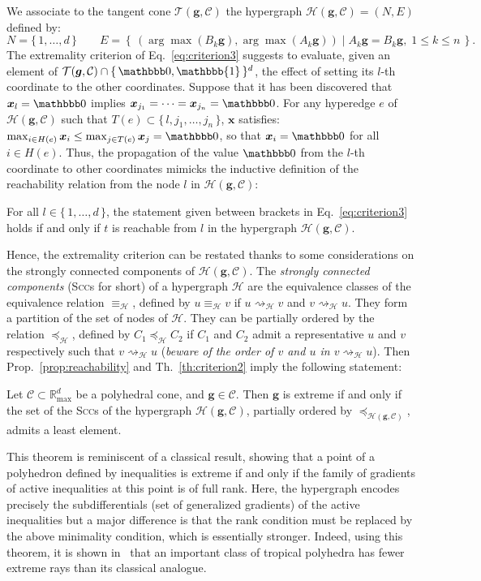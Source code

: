 \documentclass[proceedings]{stacs}
\newcommand{\maxplus}{\mathbb{R}_{\max}}
\newcommand{\mpone}{\mathbbb{1}}
\newcommand{\vect}[1]{\boldsymbol #1}
\newcommand{\CC}{\mathcal{C}}
\newcommand{\HH}{\mathcal{H}}
\newcommand{\argmax}{\arg\max}\newcommand{\tangent}{\mathcal{T}}
\newcommand{\mpzeroone}{\{\,\mpzero,\mpone\,\}}\newcommand{\mponealt}{\mpone}
\newcommand{\reachable}{\rightsquigarrow}
\newcommand{\reach}{\reachable}
\newcommand{\reacheq}{\equiv}
\newcommand{\reachleq}{\preceq}
\newcommand{\scc}{\textsc{Scc}}
\begin{document}
We associate to the tangent cone $\tangent(\vect{g}, \CC)$ the hypergraph $\HH(\vect{g},\CC) = (N,E)$ defined by:
\[
N = \{\, 1,\dots,d\, \} \qquad E = \left\{\, (\argmax(B_k \vect{g}), \argmax(A_k \vect{g})) \mid A_k \vect{g} = B_k \vect{g}, \; 1 \leq k \leq n \,\right\}.
\]
The extremality criterion of Eq.~\eqref{eq:criterion3} suggests to evaluate, given an element of $\tangent(\vect{g},\CC) \cap \mpzeroone^d$, the effect of setting its $l$-th coordinate to the other coordinates. Suppose that it has been discovered that $\vect{x}_l = \mpzero$ implies $\vect{x}_{j_1} = \dots = \vect{x}_{j_n} = \mpzero$. For any hyperedge $e$ of $\HH(\vect{g},\CC)$ such that $T(e) \subset \{\, l,j_1,\dots,j_n \,\}$, $\vect{x}$ satisfies:
$
\max_{i \in H(e)} \vect{x}_i \leq \max_{j \in T(e)} \vect{x}_j = \mpzero
$,
so that $\vect{x}_i = \mpzero$ for all $i \in H(e)$. Thus, the propagation of the value $\mpzero$ from the $l$-th coordinate to other coordinates mimicks the inductive definition of the reachability relation from the node $l$ in $\HH(\vect{g},\CC)$:
\begin{proposition}\label{prop:reachability}
For all $l \in \{\,1,\dots,d\,\}$, the statement given between brackets in Eq.~\eqref{eq:criterion3} holds if and only if $t$ is reachable from $l$ in the hypergraph $\HH(\vect{g},\CC)$.
\end{proposition}
Hence, the extremality criterion can be restated thanks to some considerations on the strongly connected components of $\HH(\vect{g},\CC)$. The \emph{strongly connected components} (\scc{}s for short) of a hypergraph $\HH$ are the equivalence classes of the equivalence relation $\reacheq_\HH$, defined by $u \reacheq_\HH v$ if $u \reach_\HH v$ and $v \reach_\HH u$. They form a partition of the set of nodes of $\HH$. They can be partially ordered by the relation $\reachleq_\HH$, defined by $C_1 \reachleq_\HH C_2$ if $C_1$ and $C_2$ admit a representative $u$ and $v$ respectively such that $v \reach_\HH u$ (\emph{beware of the order of $v$ and $u$ in $v \reach_\HH u$}). Then Prop.~\ref{prop:reachability} and Th.~\ref{th:criterion2} imply the following statement:
\begin{theorem}\label{th:minimality}
Let $\CC \subset \maxplus^d$ be a polyhedral cone, and $\vect{g} \in \CC$. Then $\vect{g}$ is extreme if and only if the set of the \scc{}s of the hypergraph $\HH(\vect{g},\CC)$, partially ordered by $\reachleq_{\HH(\vect{g},\CC)}$, admits a least element. 
\end{theorem}
This theorem is reminiscent of a classical result,
showing that a point of a polyhedron defined by inequalities
is extreme if and only if the family of gradients of active inequalities
at this point is of full rank. Here, the hypergraph encodes precisely the
subdifferentials (set of generalized gradients) of the active inequalities
but a major difference is that the rank
condition must be replaced by the above minimality condition, which is
essentially stronger. Indeed, using this theorem, it is shown in~\cite{AGK09} that an important class of tropical polyhedra has fewer extreme rays than its classical analogue. 
\end{document}
